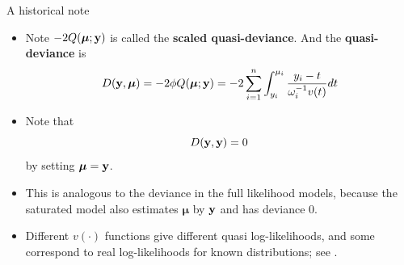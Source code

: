 \documentclass{beamer}
\newcommand{\boldmu}{{\boldsymbol \mu}}
\newenvironment{wideitemize}%
  {\begin{itemize}%
    \setlength{\parskip}{1em}}%
  {\end{itemize}}
\begin{document}

\begin{frame} {A historical note }


\begin{wideitemize}

\item 
Note $-2Q(\mbox{\boldmath $\mu$}; \textbf{y})$ is called the \textbf{scaled quasi-deviance}.
And the \textbf{quasi-deviance} is
\[
D(\textbf{y}, \mbox{\boldmath $\mu$})=-2\phi Q(\mbox{\boldmath $\mu$}; \textbf{y})
=-2\sum_{i=1}^n\int_{y_i}^{\mu_i}\frac{y_i-t}{\omega_i^{-1} v(t)}dt
\]

\item  Note that
\[
D({\bf y}, {\bf y}) = 0
\]
by setting $\boldmu = {\bf y}$.

\item  This   is analogous to the deviance in the full likelihood models, because the saturated model also estimates $\boldmu$ by ${\bf y}$ and  has deviance $0$. 



\item Different $v(\cdot)$ functions give different quasi log-likelihoods, and some correspond to real log-likelihoods for known distributions; see \cite[Chapter 9, Table 9.1]{GLM1989}.
\end{wideitemize}
\end{frame}

%
\end{document}
